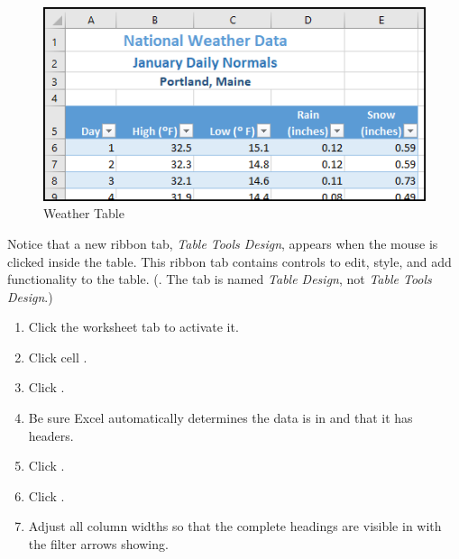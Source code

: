 \begin{figure}[H]
	\centering
	\includegraphics[width=\maxwidth{.95\linewidth}]{gfx/ch05_fig03}
	\caption{Weather Table}
	\label{05:fig03}
\end{figure}

Notice that a new ribbon tab, \textit{Table Tools Design}, appears when the mouse is clicked inside the table. This ribbon tab contains controls to edit, style, and add functionality to the table. (. The tab is named \textit{Table Design}, not \textit{Table Tools Design}.)

\begin{enumbox}
	\begin{enumerate}
		\item Click the  worksheet tab to activate it.
		\item Click cell .
		\item Click .
		\item Be sure Excel automatically determines the data is in  and that it has headers.
		\item Click .
		\item Click .
		\item Adjust all column widths so that the complete headings are visible in  with the filter arrows showing. 
	\end{enumerate}
\end{enumbox}

